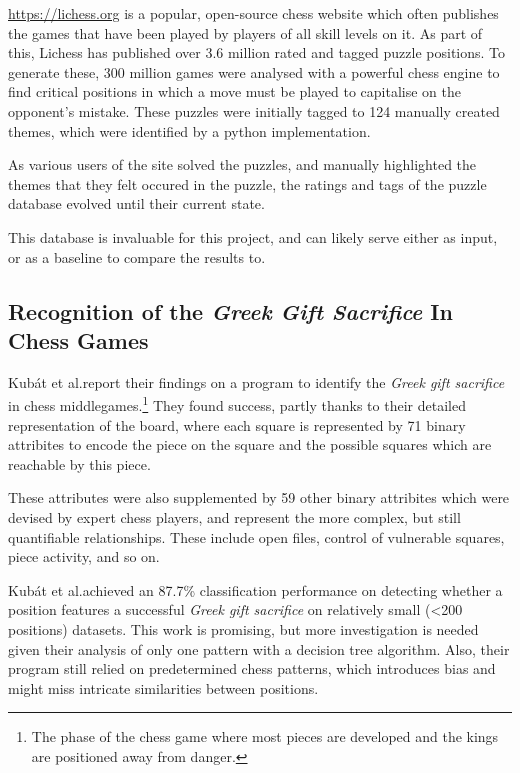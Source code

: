 \url{https://lichess.org} is a popular, open-source chess website which often
publishes the games that have been played by players of all skill levels on it.
As part of this, Lichess has published over 3.6 million rated and tagged puzzle
positions.\cite{lichessPuzzles} To generate these, 300 million games were
analysed with a powerful chess engine to find critical positions in which a
move must be played to capitalise on the opponent's mistake. These puzzles were
initially tagged to 124 manually created themes,\cite{lichessXML} which were
identified by a python implementation.\cite{lichessTagger} 

As various users of the site solved the puzzles, and manually highlighted the
themes that they felt occured in the puzzle, the ratings and tags of the puzzle
database evolved until their current state.

This database is invaluable for this project, and can likely serve either as
input, or as a baseline to compare the results to.

\subsection{Recognition of the \emph{Greek Gift Sacrifice} In Chess Games}

Kub\'{a}t et al.\@ report their findings on a program \cite{middlegamePatterns}
to identify the \emph{Greek gift sacrifice} in chess middlegames.\footnote{The
phase of the chess game where most pieces are developed and the kings are
positioned away from danger.} They found success, partly thanks to their
detailed representation of the board, where each square is represented by 71
binary attribites \cite{middlegamePatterns} to encode the piece on the square
and the possible squares which are reachable by this piece. 

These attributes were also supplemented by 59 other binary attribites which
were devised by expert chess players, and represent the more complex, but still
quantifiable relationships.\cite{middlegamePatterns} These include open files,
control of vulnerable squares, piece activity, and so on.

Kub\'{a}t et al.\@ achieved an 87.7\% classification performance on detecting
whether a position features a successful \emph{Greek gift sacrifice} on
relatively small (<200 positions) datasets. This work is promising, but more
investigation is needed given their analysis of only one pattern with a
decision tree algorithm. Also, their program still relied on predetermined
chess patterns, which introduces bias and might miss intricate similarities
between positions.

